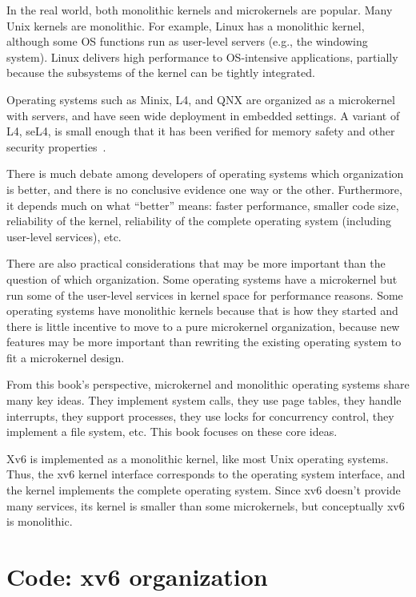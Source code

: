 In the real world, both monolithic kernels and microkernels are
popular. Many
Unix kernels are monolithic. For example, Linux has a monolithic kernel,
although some OS functions run as user-level servers (e.g., the windowing
system).  Linux delivers high performance to OS-intensive applications, partially
because the subsystems of the kernel can be tightly integrated.

Operating systems such as Minix, L4, and QNX are organized as a microkernel with
servers, and have seen wide deployment in embedded settings.  A
variant of L4, seL4, is small enough that it has been verified for
memory safety and other security properties~\cite{sel4}.

There is much debate among developers of operating systems which
organization is better, and there is no conclusive evidence one way or
the other.  Furthermore, it depends much on what ``better'' means:
faster performance, smaller code size, reliability of the kernel,
reliability of the complete operating system (including user-level
services), etc.

There are also practical considerations that may be more important
than the question of which organization.  Some operating systems
have a microkernel but run some of the user-level services in kernel
space for performance reasons.  Some operating systems have monolithic
kernels because that is how they started and there is little incentive
to move to a pure microkernel organization, because new features may
be more important than rewriting the existing operating system to fit a microkernel
design.

From this book's perspective, microkernel and monolithic operating
systems share many key ideas.  They implement system calls, they use
page tables, they handle interrupts, they support processes, they use
locks for concurrency control, they implement a file system,
etc. This book focuses on these core ideas.

Xv6 is
implemented as a monolithic kernel, like most Unix operating systems.
Thus, the xv6 kernel interface corresponds to the operating system
interface, and the kernel implements the complete operating system.  Since 
xv6 doesn't provide many services, its kernel is smaller than some
microkernels, but conceptually xv6 is monolithic.  

\section{Code: xv6 organization}

